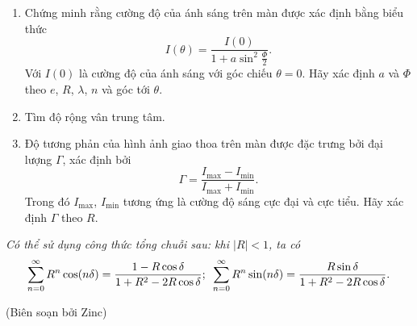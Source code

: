 \begin{enumerate}[label=\textbf{\alph*,}]\itemsep0em
    \item Chứng minh rằng cường độ của ánh sáng trên màn được xác định bằng biểu thức
    $$I(\theta) = \frac{I(0)}{1 + a \sin^2 \frac{\Phi}{2}}.$$
    Với $I(0)$ là cường độ của ánh sáng với góc chiếu $\theta=0$. Hãy xác định $a$ và $\Phi$ theo $e$, $R$, $\lambda$, $n$ và góc tới $\theta$. 
    \item Tìm độ rộng vân trung tâm.
    \item Độ tương phản của hình ảnh giao thoa trên màn được đặc trưng bởi đại lượng $\Gamma$, xác định bởi
    $$\Gamma = \frac{I_{\text{max}} - I_{\text{min}}}{I_{\text{max}}+ I_{\text{min}}}.$$
    Trong đó $I_{\text{max}}$, $I_{\text{min}}$ tương ứng là cường độ sáng cực đại và cực tiểu. Hãy xác định $\Gamma$ theo $R$.
\end{enumerate}

\textit{Có thể sử dụng công thức tổng chuỗi sau: khi $|R|<1$, ta có}
$$\sum_{n=0}^\infty R^n \cos (n \delta) = \frac{1 - R\cos \delta}{1 + R^2 - 2R\cos \delta}; \hspace{0.5em}
\sum_{n=0}^\infty R^n \sin (n \delta) = \frac{R\sin \delta}{1 + R^2 - 2R\cos \delta}.$$

\begin{flushright}
    (Biên soạn bởi Zinc)
\end{flushright}